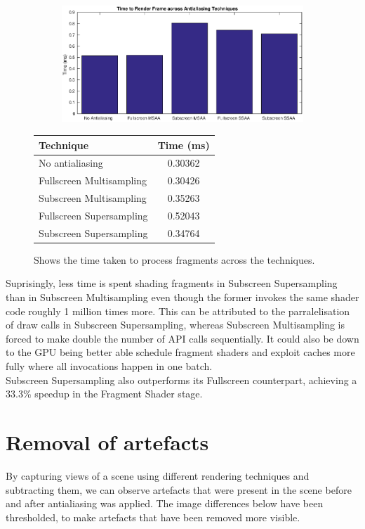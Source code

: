 \documentclass[12pt,a4paper,twoside,openright]{report}
\begin{document}
\begin{figure}[tbh]

 
\begin{subfigure}{0.5\textwidth}
\includegraphics[width=1.2\linewidth]{figs/timeToRenderFrame.eps}
\end{subfigure}
\qquad
\begin{tabular}{l|c}
Technique   & Time (ms) \\ 
\hline
No antialiasing      & 0.30362 \\
Fullscreen Multisampling     & 0.30426 \\
Subscreen Multisampling    &  0.35263  \\
Fullscreen Supersampling      &  0.52043   \\
Subscreen Supersampling    &  0.34764  \\
\end{tabular}
 
\caption{Shows the time taken to process fragments across the techniques.}
\end{figure}

Suprisingly, less time is spent shading fragments in Subscreen Supersampling than in Subscreen Multisampling even though the former invokes the same shader code roughly 1 million times more. This can be attributed to the parralelisation of draw calls in Subscreen Supersampling, whereas Subscreen Multisampling is forced to make double the number of API calls sequentially. It could also be down to the GPU being better able schedule fragment shaders and exploit caches more fully where all invocations happen in one batch.\\

Subscreen Supersampling also outperforms its Fullscreen counterpart, achieving a 33.3\% speedup in the Fragment Shader stage. 

\clearpage
\section{Removal of artefacts}
By capturing views of a scene using different rendering techniques and subtracting them, we can observe artefacts that were present in the scene before and after antialiasing was applied. The image differences below have been thresholded, to make artefacts that have been removed more visible. 
\end{document}
